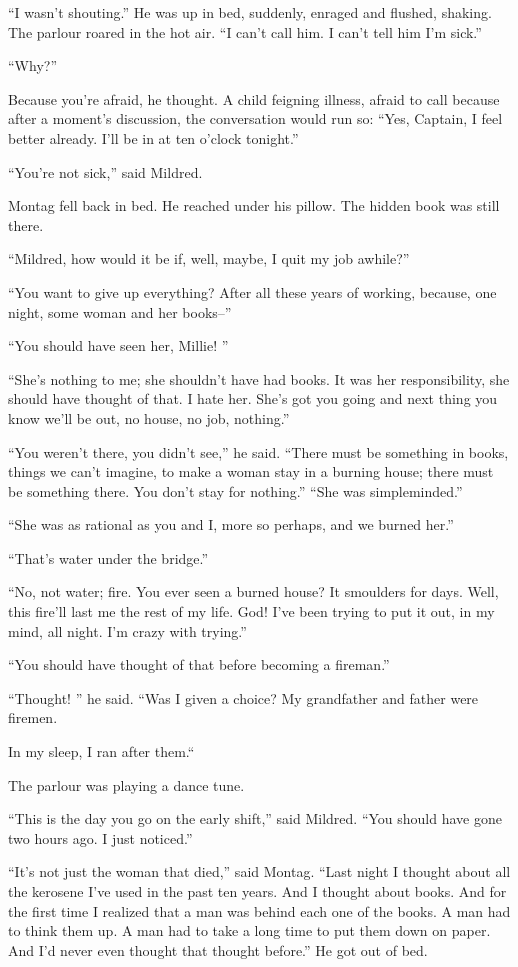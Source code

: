 \documentclass[11pt,openany]{book}
\begin{document}
``I wasn't shouting.'' He was up in bed, suddenly, enraged and flushed, shaking. The parlour roared in the hot air. ``I can't call him. I can't tell him I'm sick.''

``Why?''

Because you're afraid, he thought. A child feigning illness, afraid to call because after a moment's discussion, the conversation would run so: ``Yes, Captain, I feel better already. I'll be in at ten o'clock tonight.''

``You're not sick,'' said Mildred.

Montag fell back in bed. He reached under his pillow. The hidden book was still there.

``Mildred, how would it be if, well, maybe, I quit my job awhile?''

``You want to give up everything? After all these years of working, because, one night, some woman and her books--''

``You should have seen her, Millie! ''

``She's nothing to me; she shouldn't have had books. It was her responsibility, she should have thought of that. I hate her. She's got you going and next thing you know we'll be out, no house, no job, nothing.''

``You weren't there, you didn't see,'' he said. ``There must be something in books, things we can't imagine, to make a woman stay in a burning house; there must be something there. You don't stay for nothing.'' ``She was simpleminded.''

``She was as rational as you and I, more so perhaps, and we burned her.''

``That's water under the bridge.''

``No, not water; fire. You ever seen a burned house? It smoulders for days. Well, this fire'll last me the rest of my life. God! I've been trying to put it out, in my mind, all night. I'm crazy with trying.''

``You should have thought of that before becoming a fireman.''

``Thought! '' he said. ``Was I given a choice? My grandfather and father were firemen.

In my sleep, I ran after them.``

The parlour was playing a dance tune.

``This is the day you go on the early shift,'' said Mildred. ``You should have gone two hours ago. I just noticed.''

``It's not just the woman that died,'' said Montag. ``Last night I thought about all the kerosene I've used in the past ten years. And I thought about books. And for the first time I realized that a man was behind each one of the books. A man had to think them up. A man had to take a long time to put them down on paper. And I'd never even thought that thought before.'' He got out of bed.
\end{document}
